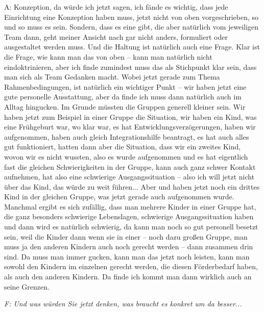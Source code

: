 A: Konzeption, da würde ich jetzt sagen, ich fände es wichtig, dass jede Einrichtung eine Konzeption haben muss, jetzt nicht von oben vorgeschrieben, so und so muss es sein. Sondern, dass es eine gibt, die aber natürlich vom jeweiligen Team dann, geht meiner Ansicht nach gar nicht anders, formuliert oder ausgestaltet werden muss. Und die Haltung ist natürlich auch eine Frage. Klar ist die Frage, wie kann man das von oben – kann man natürlich nicht eindoktrinieren, aber ich finde zumindest muss das als Stichpunkt klar sein, dass man sich als Team Gedanken macht. Wobei jetzt gerade zum Thema Rahmenbedingungen, ist natürlich ein wichtiger Punkt – wir haben jetzt eine gute personelle Ausstattung, aber da finde ich muss dann natürlich auch im Alltag hingucken. Im Grunde müssten die Gruppen generell kleiner sein. Wir haben jetzt zum Beispiel in einer Gruppe die Situation, wir haben ein Kind, was eine Frühgeburt war, wo klar war, es hat Entwicklungsverzögerungen, haben wir aufgenommen, haben auch gleich Integrationshilfe beantragt, es hat auch alles gut funktioniert, hatten dann aber die Situation, dass wir ein zweites Kind, wovon wir es nicht wussten, also es wurde aufgenommen und es hat eigentlich fast die gleichen Schwierigkeiten in der Gruppe, kann auch ganz schwer Kontakt aufnehmen, hat also eine schwierige Ausgangssituation – also ich will jetzt nicht über das Kind, das würde zu weit führen... Aber und haben jetzt noch ein drittes Kind in der gleichen Gruppe, was jetzt gerade auch aufgenommen wurde. Manchmal ergibt es sich zufällig, dass man mehrere Kinder in einer Gruppe hat, die ganz besonders schwierige Lebenslagen, schwierige Ausgangssituation haben und dann wird es natürlich schwierig, da kann man noch so gut personell besetzt sein, weil die Kinder dann wenn sie in einer – noch dazu großen Gruppe, man muss ja den anderen Kindern auch noch gerecht werden – dann zusammen drin sind. Da muss man immer gucken, kann man das jetzt noch leisten, kann man sowohl den Kindern im einzelnen gerecht werden, die diesen Förderbedarf haben, als auch den anderen Kindern. Da finde ich kommt man dann wirklich auch an seine Grenzen.

\emph{F: Und was würden Sie jetzt denken, was braucht es konkret um da besser...}

